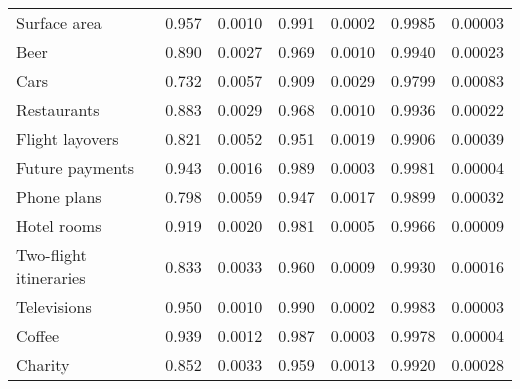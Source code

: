 \begin{tabular}[t]{lrrrrrr}
Surface area & 0.957 & 0.0010 & 0.991 & 0.0002 & 0.9985 & 0.00003\\
Beer & 0.890 & 0.0027 & 0.969 & 0.0010 & 0.9940 & 0.00023\\
Cars & 0.732 & 0.0057 & 0.909 & 0.0029 & 0.9799 & 0.00083\\
Restaurants & 0.883 & 0.0029 & 0.968 & 0.0010 & 0.9936 & 0.00022\\
\addlinespace
Flight layovers & 0.821 & 0.0052 & 0.951 & 0.0019 & 0.9906 & 0.00039\\
Future payments & 0.943 & 0.0016 & 0.989 & 0.0003 & 0.9981 & 0.00004\\
Phone plans & 0.798 & 0.0059 & 0.947 & 0.0017 & 0.9899 & 0.00032\\
Hotel rooms & 0.919 & 0.0020 & 0.981 & 0.0005 & 0.9966 & 0.00009\\
Two-flight itineraries & 0.833 & 0.0033 & 0.960 & 0.0009 & 0.9930 & 0.00016\\
\addlinespace
Televisions & 0.950 & 0.0010 & 0.990 & 0.0002 & 0.9983 & 0.00003\\
Coffee & 0.939 & 0.0012 & 0.987 & 0.0003 & 0.9978 & 0.00004\\
Charity & 0.852 & 0.0033 & 0.959 & 0.0013 & 0.9920 & 0.00028\\
\bottomrule
\end{tabular}

